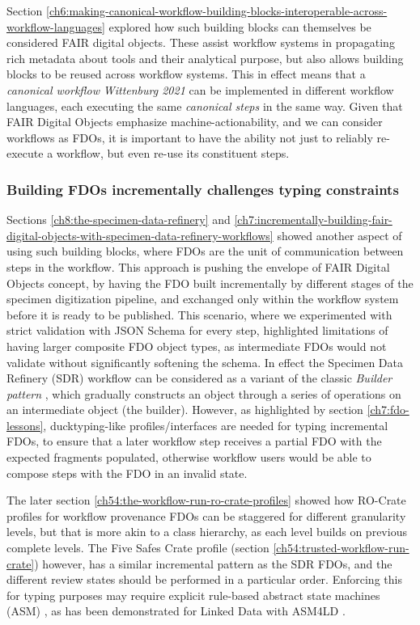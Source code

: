 Section \vref{ch6:making-canonical-workflow-building-blocks-interoperable-across-workflow-languages} explored how such building blocks can themselves be considered FAIR digital objects. These assist workflow systems in propagating rich metadata about tools and their analytical purpose, but also allows building blocks to be reused across workflow systems. This in effect means that a \emph{canonical workflow} \emph{Wittenburg 2021} can be implemented in different workflow languages, each executing the same \emph{canonical steps} in the same way. Given that FAIR Digital Objects emphasize machine-actionability, and we can consider workflows as FDOs, it is important to have the ability not just to reliably re-execute a workflow, but even re-use its constituent steps. 


\subsubsection{Building FDOs incrementally challenges typing constraints}
\label{ch61:buildingfdo}

Sections \vref{ch8:the-specimen-data-refinery} and \vref{ch7:incrementally-building-fair-digital-objects-with-specimen-data-refinery-workflows} showed another aspect of using such building blocks, where FDOs are the unit of communication between steps in the workflow. 
This approach is pushing the envelope of FAIR Digital Objects concept, by having the FDO built incrementally by different stages of the specimen digitization pipeline, and exchanged only within the workflow system before it is ready to be published. 
This scenario, where we experimented with strict validation with JSON Schema for every step, highlighted limitations of having larger composite FDO object types, as intermediate FDOs would not validate without significantly softening the schema.
In effect the Specimen Data Refinery (SDR) workflow can be considered as a variant of the classic \emph{Builder pattern} \cite[pp. 97--106]{Gamma 1995}, which gradually constructs an object through a series of operations on an intermediate object (the builder).
However, as highlighted by section \vref{ch7:fdo-lessons}, ducktyping-like profiles/interfaces are needed for typing incremental FDOs, to ensure that a later workflow step receives a partial FDO with the expected fragments populated, otherwise workflow users would be able to compose steps with the FDO in an invalid state. 

The later section \vref{ch54:the-workflow-run-ro-crate-profiles} showed how RO-Crate profiles for workflow provenance FDOs can be staggered for different granularity levels, but that is more akin to a class hierarchy, as each level builds on previous complete levels.  The Five Safes Crate profile (section \vref{ch54:trusted-workflow-run-crate}) however, has a similar incremental pattern as the SDR FDOs, and the different review states should be performed in a particular order. Enforcing this for typing purposes may require explicit rule-based abstract state machines (ASM) \cite{Gurevich 1995}, as has been demonstrated for Linked Data with ASM4LD \cite{Käfer 2018a,Käfer 2018b}.


